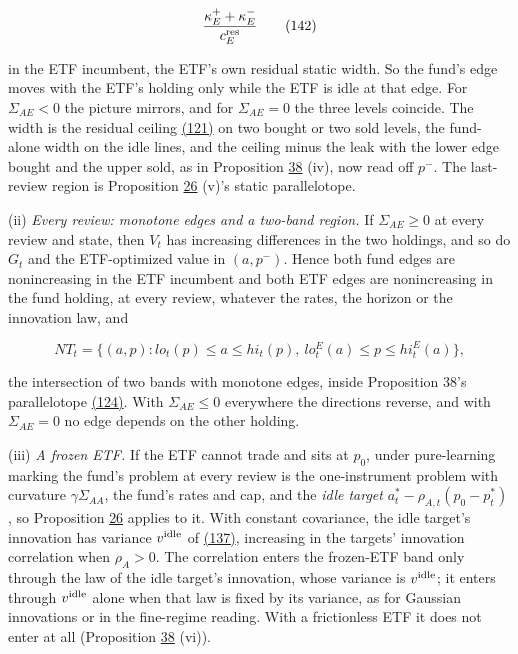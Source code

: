 \documentclass[11pt]{article}
\begin{document}
\begin{equation*}
\frac{\kappa^+_E+\kappa^-_E}{c^{\rm res}_E}\tag{142}\label{eq:142}
\end{equation*}

in the ETF incumbent, the ETF's own residual static width. So the
fund's edge moves with the ETF's holding only while the ETF is idle at
that edge. For \(\Sigma_{AE}<0\) the picture mirrors, and for \(\Sigma_{AE}=0\) the three
levels coincide. The width is the residual ceiling \hyperref[eq:121]{(121)} on two bought
or two sold levels, the fund-alone width on the idle lines, and the
ceiling minus the leak with the lower edge bought and the upper sold,
as in Proposition \hyperref[res:Proposition-38]{38} (iv), now read off \(p^-\). The last-review region
is Proposition \hyperref[res:Proposition-26]{26} (v)'s static parallelotope.

(ii) \emph{Every review: monotone edges and a two-band region.} If \(\Sigma_{AE}\geq0\)
at every review and state, then \(V_t\) has increasing differences in the
two holdings, and so do \(G_t\) and the ETF-optimized value in \((a,p^-)\).
Hence both fund edges are nonincreasing in the ETF incumbent and both
ETF edges are nonincreasing in the fund holding, at every review,
whatever the rates, the horizon or the innovation law, and

\begin{equation*}
NT_t=\bigl\{(a,p):lo_t(p)\leq a\leq hi_t(p),\ lo^E_t(a)\leq p\leq hi^E_t(a)\bigr\},\tag{143}\label{eq:143}
\end{equation*}

the intersection of two bands with monotone edges, inside Proposition
38's parallelotope \hyperref[eq:124]{(124)}. With \(\Sigma_{AE}\leq0\) everywhere the directions
reverse, and with \(\Sigma_{AE}=0\) no edge depends on the other holding.

(iii) \emph{A frozen ETF.} If the ETF cannot trade and sits at \(p_0\), under
pure-learning marking the fund's problem at every review is the
one-instrument problem with curvature \(\gamma\Sigma_{AA}\), the fund's rates and cap,
and the \emph{idle target} \(a^*_t-\rho_{A,t}(p_0-p^*_t)\), so Proposition \hyperref[res:Proposition-26]{26} applies to it.
With constant covariance, the idle target's innovation has variance
\(v^{\rm idle}\) of \hyperref[eq:137]{(137)}, increasing in the targets' innovation correlation when
\(\rho_A>0\). The correlation enters the frozen-ETF band only through the
law of the idle target's innovation, whose variance is \(v^{\rm idle}\); it
enters through \(v^{\rm idle}\) alone when that law is fixed by its variance,
as for Gaussian innovations or in the fine-regime reading. With a
frictionless ETF it does not enter at all (Proposition \hyperref[res:Proposition-38]{38} (vi)).
\end{document}
